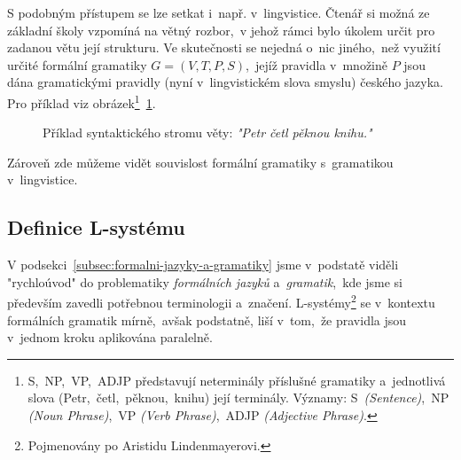 S podobným přístupem se lze setkat i~např. v~lingvistice. Čtenář si možná ze základní školy vzpomíná na větný rozbor,~v jehož rámci bylo úkolem určit pro zadanou větu její strukturu. Ve skutečnosti se nejedná o~nic jiného,~než využití určité formální gramatiky $G=(V,T,P,S)$,~jejíž pravidla v~množině $P$ jsou dána gramatickými pravidly (nyní v~lingvistickém slova smyslu) českého jazyka. Pro příklad viz obrázek\footnote{S,~NP,~VP,~ADJP představují neterminály příslušné gramatiky a~jednotlivá slova (Petr,~četl,~pěknou,~knihu) její terminály. Významy: S~\emph{(Sentence)},~NP \emph{(Noun Phrase)},~VP \emph{(Verb Phrase)},~ADJP \emph{(Adjective Phrase)}.}~\ref{fig:syntax-strom-vety}.
\begin{figure}[h]
    \centering
    \caption{Příklad syntaktického stromu věty: \emph{"Petr četl pěknou knihu."}}
    \label{fig:syntax-strom-vety}
\end{figure}
Zároveň zde můžeme vidět souvislost formální gramatiky s~gramatikou v~lingvistice.

\subsection{Definice L-systému}\label{subsec:definice-lsystemu}

V podsekci~\ref{subsec:formalni-jazyky-a-gramatiky} jsme v~podstatě viděli "rychloúvod" do problematiky \emph{formálních jazyků} a~\emph{gramatik},~kde jsme si především zavedli potřebnou terminologii a~značení. L-systémy\footnote{Pojmenovány po Aristidu Lindenmayerovi.} se v~kontextu formálních gramatik mírně,~avšak podstatně, liší v~tom,~že pravidla jsou v~jednom kroku aplikována paralelně.

